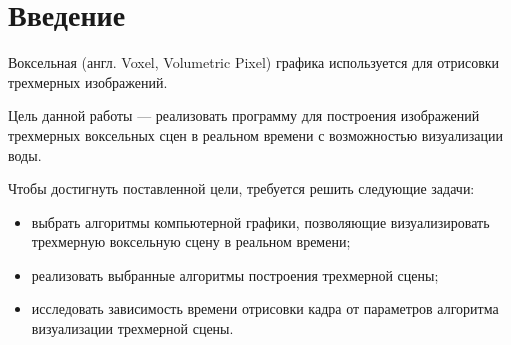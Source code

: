 \chapter*{Введение}

Воксельная (англ. Voxel, Volumetric Pixel) графика используется для отрисовки 
трехмерных изображений. 

Цель данной работы --- реализовать программу для построения 
изображений трехмерных воксельных сцен в реальном времени
с возможностью визуализации воды.

Чтобы достигнуть поставленной цели, требуется решить следующие задачи:
\begin{itemize}
    \item выбрать алгоритмы компьютерной 
          графики, позволяющие визуализировать трехмерную воксельную
          сцену в реальном времени;
    \item реализовать выбранные алгоритмы построения трехмерной сцены;
    \item исследовать зависимость времени отрисовки кадра от 
          параметров алгоритма визуализации трехмерной сцены.
\end{itemize}
